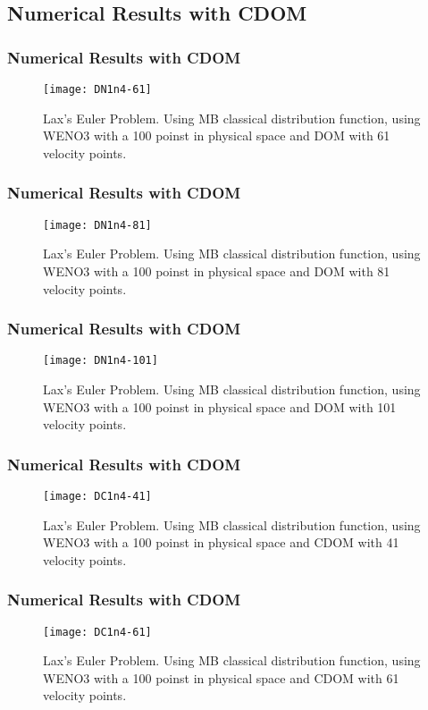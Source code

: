 \subsection{Numerical Results with CDOM}

\begin{frame}
	\frametitle{Numerical Results with CDOM}
		
		\begin{figure}
			\centering
				\texttt{[image: DN1n4-61]}
			\caption{Lax's Euler Problem. Using MB classical distribution function, using WENO3 with a 100 poinst in physical space and DOM with 61 velocity points.}
			\label{fig:DN1n4-61}
		\end{figure}
		
\end{frame}

\begin{frame}
	\frametitle{Numerical Results with CDOM}
	
		\begin{figure}
			\centering
				\texttt{[image: DN1n4-81]}
			\caption{Lax's Euler Problem. Using MB classical distribution function, using WENO3 with a 100 poinst in physical space and DOM with 81 velocity points.}
			\label{fig:DN1n4-81}
		\end{figure}
	
\end{frame}

\begin{frame}
	\frametitle{Numerical Results with CDOM}
	
		\begin{figure}
			\centering
				\texttt{[image: DN1n4-101]}
			\caption{Lax's Euler Problem. Using MB classical distribution function, using WENO3 with a 100 poinst in physical space and DOM with 101 velocity points.}
			\label{fig:DN1n4-101}
		\end{figure}
	
\end{frame}

\begin{frame}
	\frametitle{Numerical Results with CDOM}
	
		\begin{figure}
			\centering
				\texttt{[image: DC1n4-41]}
			\caption{Lax's Euler Problem. Using MB classical distribution function, using WENO3 with a 100 poinst in physical space and CDOM with 41 velocity points.}
			\label{fig:DC1n4-41}
		\end{figure}
	
\end{frame}

\begin{frame}
	\frametitle{Numerical Results with CDOM}
	
		\begin{figure}
			\centering
				\texttt{[image: DC1n4-61]}
			\caption{Lax's Euler Problem. Using MB classical distribution function, using WENO3 with a 100 poinst in physical space and CDOM with 61 velocity points.}
			\label{fig:DC1n4-61}
		\end{figure}
	
\end{frame}